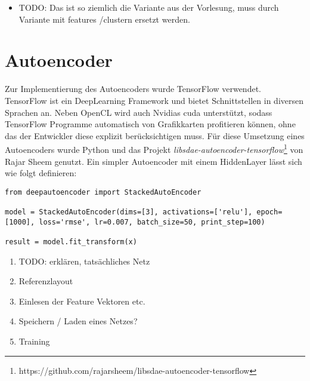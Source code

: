 \begin{itemize}
	\item TODO: Das ist so ziemlich die Variante aus der Vorlesung, muss durch Variante mit features /clustern ersetzt werden.
\end{itemize}

\section{Autoencoder}

Zur Implementierung des Autoencoders wurde TensorFlow verwendet. TensorFlow ist ein DeepLearning Framework und bietet Schnittstellen in diversen Sprachen an. Neben OpenCL wird auch Nvidias cuda unterstützt, sodass TensorFlow Programme automatisch von Grafikkarten profitieren können, ohne das der Entwickler diese explizit berücksichtigen muss. Für diese Umsetzung eines Autoencoders wurde Python und das Projekt \textit{libsdae-autoencoder-tensorflow}\footnote{https://github.com/rajarsheem/libsdae-autoencoder-tensorflow} von Rajar Sheem genutzt. Ein simpler Autoencoder mit einem HiddenLayer lässt sich wie folgt definieren:

\lstset{language=Python}
\begin{lstlisting}
from deepautoencoder import StackedAutoEncoder

model = StackedAutoEncoder(dims=[3], activations=['relu'], epoch=[1000], loss='rmse', lr=0.007, batch_size=50, print_step=100)
                       
result = model.fit_transform(x)
\end{lstlisting}

\begin{enumerate}
	\item TODO: erklären, tatsächliches Netz
	\item Referenzlayout
	\item Einlesen der Feature Vektoren etc.
	\item Speichern / Laden eines Netzes?
	\item Training
\end{enumerate}